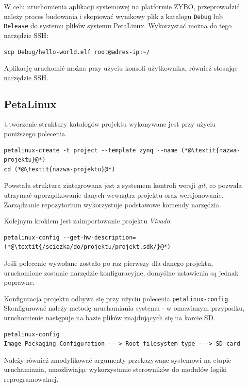 W celu uruchomienia aplikacji systemowej na platformie ZYBO, przeprowadzić należy proces budowania i skopiować wynikowy plik z katalogu \texttt{Debug} lub \texttt{Release} do systemu plików systemu PetaLinux. Wykorzystać można do tego narzędzie SSH:

\begin{lstlisting}[breaklines=true]
scp Debug/hello-world.elf root@adres-ip:~/
\end{lstlisting}

Aplikację uruchomić można przy użyciu konsoli użytkownika, również stosując narzędzie SSH.
\subsection{PetaLinux}
\label{sec:petalinux-config}

Utworzenie struktury katalogów projektu wykonywane jest przy użyciu poniższego polecenia.

\begin{lstlisting}[breaklines=true]
petalinux-create -t project --template zynq --name (*@\textit{nazwa-projektu}@*)
cd (*@\textit{nazwa-projektu}@*)
\end{lstlisting}

Powstała struktura zintegrowana jest z systemem kontroli wersji \emph{git}, co pozwala utrzymać uporządkowanie danych wewnątrz projektu oraz wersjonowanie. Zarządzanie repozytorium wykorzystuje podstawowe komendy narzędzia.

Kolejnym krokiem jest zaimportowanie projektu \emph{Vivado}.

\begin{lstlisting}[breaklines=true]
petalinux-config --get-hw-description=(*@\textit{/sciezka/do/projektu/projekt.sdk/}@*)
\end{lstlisting}

Jeśli polecenie wywołane zostało po raz pierwszy dla danego projektu, uruchomione zostanie narzędzie konfiguracyjne, domyślne ustawienia są jednak poprawne.

Konfiguracja projektu odbywa się przy użyciu polecenia \texttt{petalinux-config}.
Skonfigurować należy metodę uruchamiania systemu - w omawianym przypadku, uruchomienie następuje na bazie plików znajdujących się na karcie SD.
\begin{lstlisting}[breaklines=true]
petalinux-config
Image Packaging Configuration ---> Root filesystem type ---> SD card
\end{lstlisting}

Należy również zmodyfikować argumenty przekazywane systemowi na etapie uruchamiania, umożliwiając wykorzystanie sterowników do modułów logiki reprogramowalnej.

